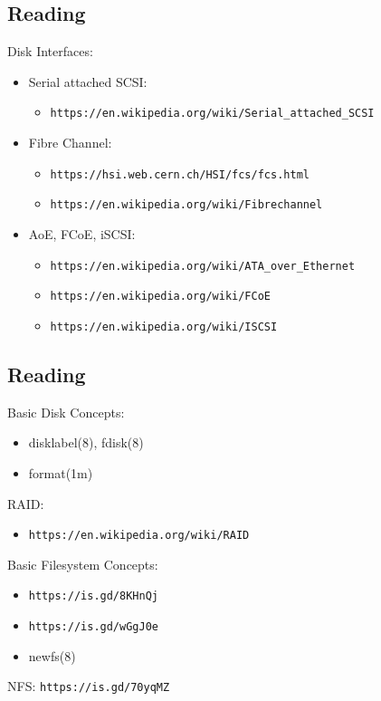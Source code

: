 \documentclass[xga]{xdvislides}
\begin{document}
\subsection{Reading}
Disk Interfaces:
\begin{itemize}
	\item Serial attached SCSI:
		\begin{itemize}
			\item \verb+https://en.wikipedia.org/wiki/Serial_attached_SCSI+
		\end{itemize}
	\item Fibre Channel:
		\begin{itemize}
			\item \verb+https://hsi.web.cern.ch/HSI/fcs/fcs.html+
			\item \verb+https://en.wikipedia.org/wiki/Fibrechannel+
		\end{itemize}
	\item AoE, FCoE, iSCSI:
		\begin{itemize}
			\item \verb+https://en.wikipedia.org/wiki/ATA_over_Ethernet+
			\item \verb+https://en.wikipedia.org/wiki/FCoE+
			\item \verb+https://en.wikipedia.org/wiki/ISCSI+
		\end{itemize}
\end{itemize}

\subsection{Reading}
Basic Disk Concepts:
\begin{itemize}
	\item disklabel(8), fdisk(8)
	\item format(1m)
\end{itemize}
RAID:
\begin{itemize}
	\item \verb+https://en.wikipedia.org/wiki/RAID+
\end{itemize}
Basic Filesystem Concepts:
\begin{itemize}
	\item \verb+https://is.gd/8KHnQj+
	\item \verb+https://is.gd/wGgJ0e+
	\item newfs(8)
\end{itemize}
NFS: \verb+https://is.gd/70yqMZ+
\end{document}
